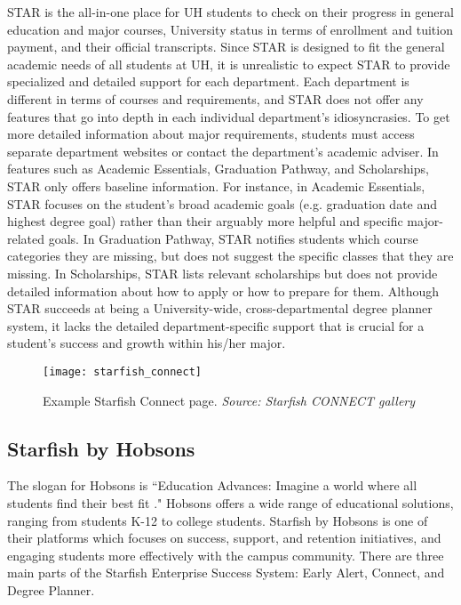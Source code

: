 STAR is the all-in-one place for UH students to check on their progress in general education and major courses, University status in terms of enrollment and tuition payment, and their official transcripts. Since STAR is designed to fit the general academic needs of all students at UH, it is unrealistic to expect STAR to provide specialized and detailed support for each department. Each department is different in terms of courses and requirements, and STAR does not offer any features that go into depth in each individual department's idiosyncrasies. To get more detailed information about major requirements, students must access separate department websites or contact the department's academic adviser. 
In features such as Academic Essentials, Graduation Pathway, and Scholarships, STAR only offers baseline information. For instance, in Academic Essentials, STAR focuses on the student's broad academic goals (e.g. graduation date and highest degree goal) rather than their arguably more helpful and specific major-related goals. In Graduation Pathway, STAR notifies students which course categories they are missing, but does not suggest the specific classes that they are missing. In Scholarships, STAR lists relevant scholarships but does not provide detailed information about how to apply or how to prepare for them. Although STAR succeeds at being a University-wide, cross-departmental degree planner system, it lacks the detailed department-specific support that is crucial for a student's success and growth within his/her major. 

\begin{figure}[h]
\centering
\texttt{[image: starfish\_connect]}
\caption{Example Starfish Connect page. \textit{Source: Starfish CONNECT gallery}}
\label{starfish-connect}
\end{figure}
\subsection{Starfish by Hobsons}

The slogan for Hobsons is ``Education Advances: Imagine a world where all students find their best fit \cite{Starfish}." Hobsons offers a wide range of educational solutions, ranging from students K-12 to college students. Starfish by Hobsons is one of their platforms which focuses on success, support, and retention initiatives, and engaging students more effectively with the campus community. There are three main parts of the Starfish Enterprise Success System: Early Alert, Connect, and Degree Planner.


